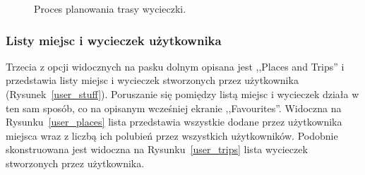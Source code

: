 \begin{figure}[H]
            \caption{Proces planowania trasy wycieczki.\label{draw}}
            \qquad
        \end{figure} 

        \subsubsection{Listy miejsc i wycieczek użytkownika}
        Trzecia z opcji widocznych na pasku dolnym opisana jest ,,Places and Trips'' i przedstawia listy miejsc i wycieczek stworzonych przez użytkownika (Rysunek~\ref{user_stuff}).
        Poruszanie się pomiędzy listą miejsc i wycieczek działa w ten sam sposób, co na opisanym wcześniej ekranie ,,Favourites''. Widoczna na Rysunku~\ref{user_places} lista przedstawia wszystkie dodane
        przez użytkownika miejsca wraz z liczbą ich polubień przez wszystkich użytkowników. Podobnie skonstruowana jest widoczna na Rysunku~\ref{user_trips} lista wycieczek stworzonych przez użytkownika.

